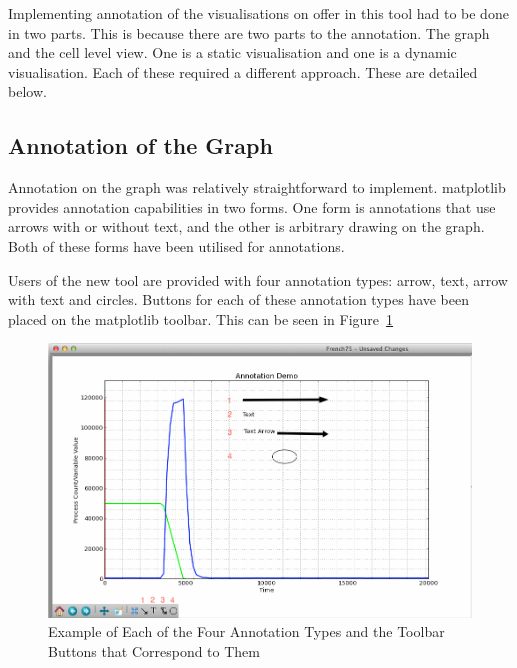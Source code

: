 Implementing annotation of the visualisations on offer in this tool had to be done in two parts.  This is because there are two parts to the annotation.  The graph and the cell level view.  One is a static visualisation and one is a dynamic visualisation.  Each of these required a different approach.  These are detailed below.

\subsection{Annotation of the Graph}

Annotation on the graph was relatively straightforward to implement.  matplotlib provides annotation capabilities in two forms.  One form is annotations that use arrows with or without text, and the other is arbitrary drawing on the graph.  Both of these forms have been utilised for annotations.

Users of the new tool are provided with four annotation types: arrow, text, arrow with text and circles.  Buttons for each of these annotation types have been placed on the matplotlib toolbar.  This can be seen in Figure~\ref{fig:annotation_demo}

\begin{figure}[h!]
    \centering
    \includegraphics[width=\textwidth]{images/annotation_demo.png}
    \caption{Example of Each of the Four Annotation Types and the Toolbar Buttons that Correspond to Them}
    \label{fig:annotation_demo}
\end{figure}

